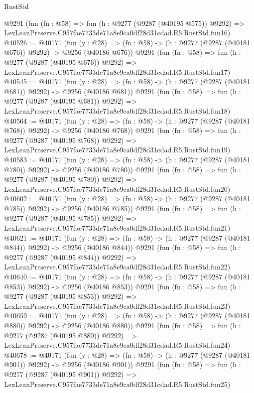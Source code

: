 \begin{lexlean}{RustStd}
\begin{coremodule}
    @9291
    (fun (fn : @58) =>
    fun (h : @9277 (@9287 (@40195 @575)) @9292) =>
    LexLeanPreserve.C957fae7733de71a8e9ca0df28d31cdad.R5.RustStd.fun16)
@40526 := @40171
    (fun (y : @28) => (fn : @58) -> (h : @9277 (@9287 (@40181 @676)) @9292) -> @9256 (@40186 @676))
    @9291
    (fun (fn : @58) =>
    fun (h : @9277 (@9287 (@40195 @676)) @9292) =>
    LexLeanPreserve.C957fae7733de71a8e9ca0df28d31cdad.R5.RustStd.fun17)
@40545 := @40171
    (fun (y : @28) => (fn : @58) -> (h : @9277 (@9287 (@40181 @681)) @9292) -> @9256 (@40186 @681))
    @9291
    (fun (fn : @58) =>
    fun (h : @9277 (@9287 (@40195 @681)) @9292) =>
    LexLeanPreserve.C957fae7733de71a8e9ca0df28d31cdad.R5.RustStd.fun18)
@40564 := @40171
    (fun (y : @28) => (fn : @58) -> (h : @9277 (@9287 (@40181 @768)) @9292) -> @9256 (@40186 @768))
    @9291
    (fun (fn : @58) =>
    fun (h : @9277 (@9287 (@40195 @768)) @9292) =>
    LexLeanPreserve.C957fae7733de71a8e9ca0df28d31cdad.R5.RustStd.fun19)
@40583 := @40171
    (fun (y : @28) => (fn : @58) -> (h : @9277 (@9287 (@40181 @780)) @9292) -> @9256 (@40186 @780))
    @9291
    (fun (fn : @58) =>
    fun (h : @9277 (@9287 (@40195 @780)) @9292) =>
    LexLeanPreserve.C957fae7733de71a8e9ca0df28d31cdad.R5.RustStd.fun20)
@40602 := @40171
    (fun (y : @28) => (fn : @58) -> (h : @9277 (@9287 (@40181 @785)) @9292) -> @9256 (@40186 @785))
    @9291
    (fun (fn : @58) =>
    fun (h : @9277 (@9287 (@40195 @785)) @9292) =>
    LexLeanPreserve.C957fae7733de71a8e9ca0df28d31cdad.R5.RustStd.fun21)
@40621 := @40171
    (fun (y : @28) => (fn : @58) -> (h : @9277 (@9287 (@40181 @844)) @9292) -> @9256 (@40186 @844))
    @9291
    (fun (fn : @58) =>
    fun (h : @9277 (@9287 (@40195 @844)) @9292) =>
    LexLeanPreserve.C957fae7733de71a8e9ca0df28d31cdad.R5.RustStd.fun22)
@40640 := @40171
    (fun (y : @28) => (fn : @58) -> (h : @9277 (@9287 (@40181 @853)) @9292) -> @9256 (@40186 @853))
    @9291
    (fun (fn : @58) =>
    fun (h : @9277 (@9287 (@40195 @853)) @9292) =>
    LexLeanPreserve.C957fae7733de71a8e9ca0df28d31cdad.R5.RustStd.fun23)
@40659 := @40171
    (fun (y : @28) => (fn : @58) -> (h : @9277 (@9287 (@40181 @880)) @9292) -> @9256 (@40186 @880))
    @9291
    (fun (fn : @58) =>
    fun (h : @9277 (@9287 (@40195 @880)) @9292) =>
    LexLeanPreserve.C957fae7733de71a8e9ca0df28d31cdad.R5.RustStd.fun24)
@40678 := @40171
    (fun (y : @28) => (fn : @58) -> (h : @9277 (@9287 (@40181 @901)) @9292) -> @9256 (@40186 @901))
    @9291
    (fun (fn : @58) =>
    fun (h : @9277 (@9287 (@40195 @901)) @9292) =>
    LexLeanPreserve.C957fae7733de71a8e9ca0df28d31cdad.R5.RustStd.fun25)

\end{coremodule}
\end{lexlean}
